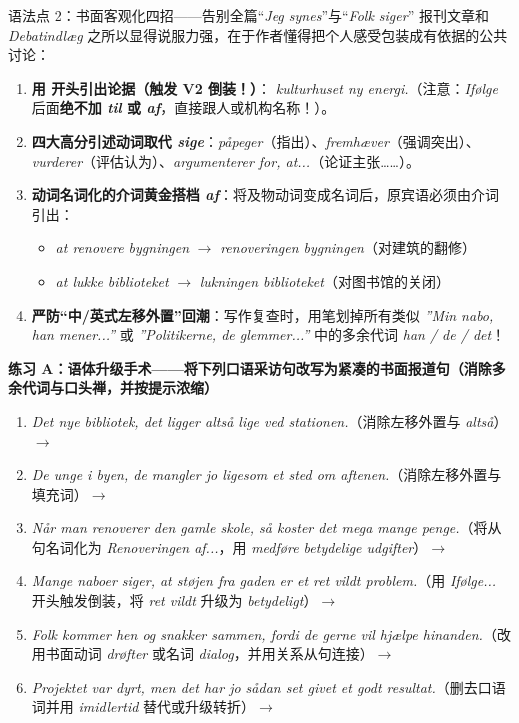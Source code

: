 \begin{grammatikbox}{语法点 2：书面客观化四招——告别全篇“\textit{Jeg synes}”与“\textit{Folk siger}”}
报刊文章和 \textit{Debatindlæg} 之所以显得说服力强，在于作者懂得把个人感受包装成有依据的公共讨论：
\begin{enumerate}
  \item \textbf{用  开头引出论据（触发 V2 倒装！）}：\textit{  kulturhuset ny energi.}（注意：\textit{Ifølge} 后面\textbf{绝不加 \textit{til} 或 \textit{af}}，直接跟人或机构名称！）。
  \item \textbf{四大高分引述动词取代 \textit{sige}}：\textit{påpeger}（指出）、\textit{fremhæver}（强调突出）、\textit{vurderer}（评估认为）、\textit{argumenterer for, at...}（论证主张……）。
  \item \textbf{动词名词化的介词黄金搭档 \textit{af}}：将及物动词变成名词后，原宾语必须由介词  引出：
    \begin{itemize}
      \item \textit{at renovere bygningen} $\rightarrow$ \textit{renoveringen  bygningen}（对建筑的翻修）
      \item \textit{at lukke biblioteket} $\rightarrow$ \textit{lukningen  biblioteket}（对图书馆的关闭）
    \end{itemize}
  \item \textbf{严防“中/英式左移外置”回潮}：写作复查时，用笔划掉所有类似 \textit{”Min nabo, han mener...”} 或 \textit{”Politikerne, de glemmer...”} 中的多余代词 \textit{han / de / det}！
\end{enumerate}
\end{grammatikbox}


\textbf{练习 A：语体升级手术——将下列口语采访句改写为紧凑的书面报道句（消除多余代词与口头禅，并按提示浓缩）}
\begin{enumerate}
  \item \textit{Det nye bibliotek, det ligger altså lige ved stationen.}（消除左移外置与 \textit{altså}）$\rightarrow$
  \item \textit{De unge i byen, de mangler jo ligesom et sted om aftenen.}（消除左移外置与填充词）$\rightarrow$
  \item \textit{Når man renoverer den gamle skole, så koster det mega mange penge.}（将从句名词化为 \textit{Renoveringen af...}，用 \textit{medføre betydelige udgifter}）$\rightarrow$
  \item \textit{Mange naboer siger, at støjen fra gaden er et ret vildt problem.}（用 \textit{Ifølge...} 开头触发倒装，将 \textit{ret vildt} 升级为 \textit{betydeligt}）$\rightarrow$
  \item \textit{Folk kommer hen og snakker sammen, fordi de gerne vil hjælpe hinanden.}（改用书面动词 \textit{drøfter} 或名词 \textit{dialog}，并用关系从句连接）$\rightarrow$
  \item \textit{Projektet var dyrt, men det har jo sådan set givet et godt resultat.}（删去口语词并用 \textit{imidlertid} 替代或升级转折）$\rightarrow$
\end{enumerate}

